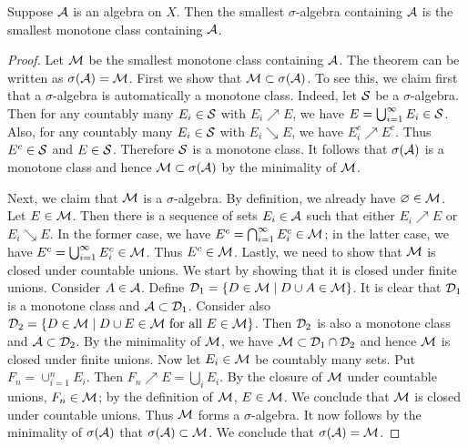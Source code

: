 \begin{theorem}
    Suppose $\A$ is an algebra on $X$. Then the smallest $\sigma$-algebra 
    containing $\A$ is the smallest monotone class containing $\A$.
\end{theorem}
\begin{proof}
    Let $\M$ be the smallest monotone class containing $\A$. The theorem 
    can be written as $\sigma(\A) = \M$. First we show that $\M\subset\sigma(\A)$. 
    To see this, we claim first that a $\sigma$-algebra is automatically a monotone 
    class. Indeed, let $\S$ be a $\sigma$-algebra. Then for any countably 
    many $E_i\in\S$ with $E_i\nearrow E$, we have $E = \bigcup_{i=1}^\infty E_i\in\S$. 
    Also, for any countably many $E_i\in\S$ with $E_i\searrow E$, we have 
    $E_i^c\nearrow E^c$. Thus $E^c\in\S$ and $E\in\S$. Therefore $\S$ is a monotone class. 
    It follows that $\sigma(\A)$ is a monotone class and hence $\M\subset\sigma(\A)$ 
    by the minimality of $\M$.

    Next, we claim that $\M$ is a $\sigma$-algebra. By definition, we already 
    have $\varnothing\in\M$. Let $E\in\M$. Then there is a sequence 
    of sets $E_i\in\A$ such that either $E_i\nearrow E$ or $E_i\searrow E$. In 
    the former case, we have $E^c = \bigcap_{i=1}^\infty E_i^c\in\M$; in the latter 
    case, we have $E^c = \bigcup_{i=1}^\infty E_i^c\in\M$. Thus $E^c\in\M$. Lastly, 
    we need to show that $\M$ is closed under countable unions. We start by showing 
    that it is closed under finite unions. Consider $A\in\A$. Define $\D_1 
    = \Set{D\in\M}{D\cup A \in\M}$. It is clear that $\D_1$ is a monotone class and 
    $\A\subset\D_1$. Consider also $\D_2 = \Set{D\in\M}{D\cup E\in\M \text{ for all } E\in\M}$. 
    Then $\D_2$ is also a monotone class and $\A\subset\D_2$. By the minimality of 
    $\M$, we have $\M\subset\D_1\cap\D_2$ and hence $\M$ is closed under finite unions. 
    Now let $E_i\in\M$ be countably many sets. Put $F_n = \cup_{i=1}^n E_i$. 
    Then $F_n\nearrow E = \bigcup_i E_i$. By the closure of $\M$ under countable unions, 
    $F_n\in\M$; by the definition of $\M$, $E\in\M$. We conclude that $\M$ is closed under 
    countable unions. Thus $\M$ forms a $\sigma$-algebra. It now follows by the minimality 
    of $\sigma(\A)$ that $\sigma(\A)\subset\M$. We conclude that $\sigma(\A) = \M$.
\end{proof}


